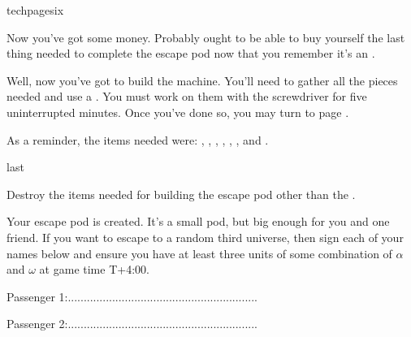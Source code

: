 \documentclass[greennotebook]{guildcamp3} %
\begin{document}
\begin{page}{techpagesix}
	
Now you've got some money. Probably ought to be able to buy yourself the last thing needed to complete the escape pod now that you remember it's an \iTransistor{}. 

Well, now you've got to build the machine. You'll need to gather all the pieces needed and use a \iScrewdriver{}. You must work on them with the screwdriver for five uninterrupted minutes. Once you've done so, you may turn to page . 

As a reminder, the items needed were: \iScrapMetal{}, \iCircuitBoard{}, \iCog{}, \iGraphiteLube{}, \iFlashlight{}, \iNiobiumCarbide{}, and \iTransistor{}. 
	
\end{page}	


\begin{page}[at last...]{last}
	
Destroy the items needed for building the escape pod other than the \iScrewdriver{}.

Your escape pod is created. It's a small pod, but big enough for you and one friend. If you want to escape to a random third universe, then sign each of your names below and ensure you have at least three units of some combination of $\alpha$ and $\omega$ at game time T+4:00. 

Passenger 1:............................................................

Passenger 2:............................................................


\end{page}



\endnotebook
\end{document}
